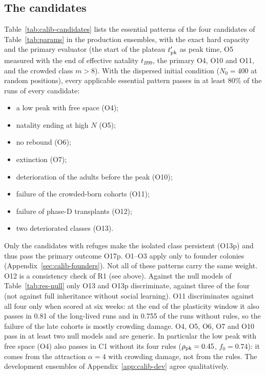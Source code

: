 \subsection{The candidates}
\label{sec:calib-candidates}

Table~\ref{tab:calib-candidates} lists the essential patterns of the four candidates of Table~\ref{tab:params} in
the production ensembles, with the exact hard capacity and the primary evaluator (the start of the
plateau $t'_{\rm pk}$ as peak time, O5 measured with the end of effective natality $t_{B99}$, the primary O4, O10
and O11, and the crowded class $m>8$). With the dispersed initial condition ($N_0=400$ at random positions), every
applicable essential pattern passes in at least 80\% of the runs of every candidate:
\begin{itemize}
  \item a low peak with free space (O4);
  \item natality ending at high $N$ (O5);
  \item no rebound (O6);
  \item extinction (O7);
  \item deterioration of the adults before the peak (O10);
  \item failure of the crowded-born cohorts (O11);
  \item failure of phase-D transplants (O12);
  \item two deteriorated classes (O13).
\end{itemize}
Only the candidates with refuges make the isolated class persistent (O13p) and thus pass the primary outcome
O17p. O1--O3 apply only to founder colonies (Appendix~\ref{sec:calib-founders}). Not all of these patterns carry the
same weight. O12 is a consistency check of R1 (see above). Against the null models of Table~\ref{tab:res-null}
only O13 and O13p discriminate, against three of the four (not against full inheritance without social learning).
O11 discriminates against all four only when scored at six weeks: at the end of the plasticity window it also passes
in 0.81 of the long-lived runs and in 0.755 of the runs without rules, so the failure of the late cohorts is mostly
crowding damage. O4, O5, O6, O7 and O10 pass in at least two null models and are generic. In particular the low peak with free space (O4) also passes in \textsf{C1} without its four
rules ($\rho_{\rm pk}=0.45$, $f_0=0.74$): it comes from the attraction $\alpha=4$ with crowding damage, not from the
rules. The development ensembles of Appendix~\ref{app:calib-dev} agree qualitatively.

